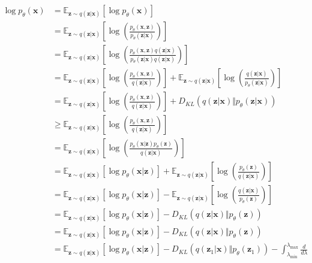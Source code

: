 \documentclass[ oneside,%
                    author={George Herbert},
                    degree={MSci},
                     title={Video Diffusion Models for Climate Simulations},
                  subtitle={}]{dissertation}
\begin{document}
\begin{align}
      \log p_\theta(\mathbf{x})&=\mathbb{E}_{\mathbf{z}\sim q(\mathbf{z}|\mathbf{x})}\left[\log p_\theta(\mathbf{x})\right]\\
      &=\mathbb{E}_{\mathbf{z}\sim q(\mathbf{z}|\mathbf{x})}\left[\log\left(\frac{p_\theta(\mathbf{x},\mathbf{z})}{p_\theta(\mathbf{z}|\mathbf{x})}\right)\right]\\
      &=\mathbb{E}_{\mathbf{z}\sim q(\mathbf{z}|\mathbf{x})}\left[\log\left(\frac{p_\theta(\mathbf{x},\mathbf{z})q(\mathbf{z}|\mathbf{x})}{p_\theta(\mathbf{z}|\mathbf{x})q(\mathbf{z}|\mathbf{x})}\right)\right]\\
      &=\mathbb{E}_{\mathbf{z}\sim q(\mathbf{z}|\mathbf{x})}\left[\log\left(\frac{p_\theta(\mathbf{x},\mathbf{z})}{q(\mathbf{z}|\mathbf{x})}\right)\right]+\mathbb{E}_{\mathbf{z}\sim q(\mathbf{z}|\mathbf{x})}\left[\log\left(\frac{q(\mathbf{z}|\mathbf{x})}{p_\theta(\mathbf{z}|\mathbf{x})}\right)\right]\\
      &=\mathbb{E}_{\mathbf{z}\sim q(\mathbf{z}|\mathbf{x})}\left[\log\left(\frac{p_\theta(\mathbf{x},\mathbf{z})}{q(\mathbf{z}|\mathbf{x})}\right)\right]+D_{KL}(q(\mathbf{z}|\mathbf{x})\Vert p_\theta(\mathbf{z}|\mathbf{x}))\\
      &\ge \mathbb{E}_{\mathbf{z}\sim q(\mathbf{z}|\mathbf{x})}\left[\log\left(\frac{p_\theta(\mathbf{x},\mathbf{z})}{q(\mathbf{z}|\mathbf{x})}\right)\right]\\
      &=\mathbb{E}_{\mathbf{z}\sim q(\mathbf{z}|\mathbf{x})}\left[\log\left(\frac{p_\theta(\mathbf{x}|\mathbf{z})p_\theta(\mathbf{z})}{q(\mathbf{z}|\mathbf{x})}\right)\right]\\
      &=\mathbb{E}_{\mathbf{z}\sim q(\mathbf{z}|\mathbf{x})}\left[\log p_\theta(\mathbf{x}|\mathbf{z})\right]+\mathbb{E}_{\mathbf{z}\sim q(\mathbf{z}|\mathbf{x})}\left[\log\left(\frac{p_\theta(\mathbf{z})}{q(\mathbf{z}|\mathbf{x})}\right)\right]\\
      &=\mathbb{E}_{\mathbf{z}\sim q(\mathbf{z}|\mathbf{x})}\left[\log p_\theta(\mathbf{x}|\mathbf{z})\right]-\mathbb{E}_{\mathbf{z}\sim q(\mathbf{z}|\mathbf{x})}\left[\log\left(\frac{q(\mathbf{z}|\mathbf{x})}{p_\theta(\mathbf{z})}\right)\right]\\
      &=\mathbb{E}_{\mathbf{z}\sim q(\mathbf{z}|\mathbf{x})}\left[\log p_\theta(\mathbf{x}|\mathbf{z})\right]-D_{KL}(q(\mathbf{z}|\mathbf{x})\Vert p_\theta(\mathbf{z}))\\
      &=\mathbb{E}_{\mathbf{z}\sim q(\mathbf{z}|\mathbf{x})}\left[\log p_\theta(\mathbf{x}|\mathbf{z})\right]-D_{KL}(q(\mathbf{z}|\mathbf{x})\Vert p_\theta(\mathbf{z}))\\
      &=\mathbb{E}_{\mathbf{z}\sim q(\mathbf{z}|\mathbf{x})}\left[\log p_\theta(\mathbf{x}|\mathbf{z})\right]-D_{KL}(q(\mathbf{z}_1|\mathbf{x})\Vert p_\theta(\mathbf{z}_1))-\int_{\lambda_{\min}}^{\lambda_{\max}}\frac{d}{d\lambda}
\end{align}

\end{document}
